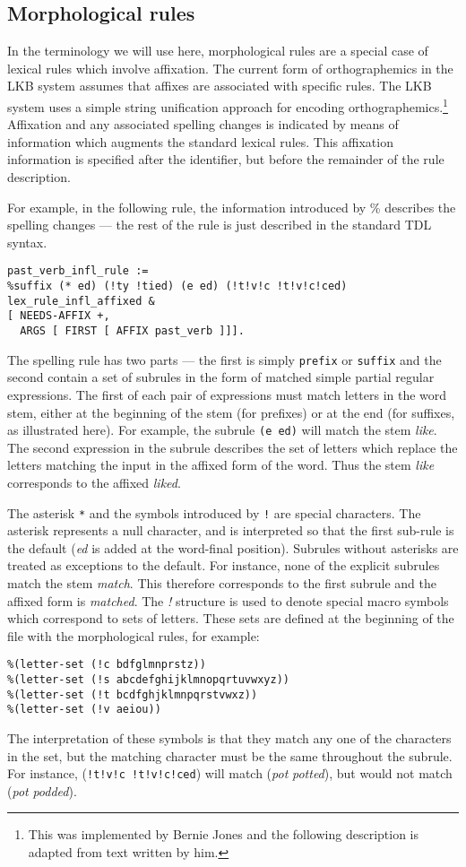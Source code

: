 \documentclass[12pt]{report}
\begin{document}
\subsection{Morphological rules}
\label{morphology}

In the terminology we will use here,
morphological rules are a special case of lexical rules which 
involve affixation.  
The current form of orthographemics in the LKB system
assumes that affixes are associated with specific rules.
The LKB system uses a simple string unification approach for encoding
orthographemics.\footnote{This was implemented by Bernie Jones
and the following description is adapted from text written by him.}
Affixation and any associated spelling changes
is indicated by means of information
which augments the standard lexical rules.
This affixation information
is specified after the identifier, but before the remainder 
of the rule description.

For example, in the following rule, the information introduced
by \% describes the spelling changes --- the rest of the rule
is just described in the standard TDL syntax.
\begin{verbatim}
past_verb_infl_rule :=
%suffix (* ed) (!ty !tied) (e ed) (!t!v!c !t!v!c!ced) 
lex_rule_infl_affixed &
[ NEEDS-AFFIX +,
  ARGS [ FIRST [ AFFIX past_verb ]]].
\end{verbatim}
The spelling rule has two parts --- the first is simply \verb+prefix+ or
\verb+suffix+ and the second
contain a set of subrules in the form of matched simple
partial regular expressions. The first of each pair of expressions must match
letters in the word stem, either at the beginning of the stem (for prefixes) or
at the end (for suffixes, as illustrated here).  For example, the
subrule \verb+(e ed)+ will match the stem {\it like}.
The second
expression in the subrule
describes the set of letters which replace
the letters matching the input in the affixed form of the word.
Thus the stem {\it like} corresponds to the affixed {\it liked}.

The asterisk \verb+*+ and the symbols introduced by \verb+!+
are special characters.
The asterisk represents a null character, and is interpreted
so that the first sub-rule is the default ({\it ed} is added at the word-final
position). 
Subrules without asterisks are treated as exceptions to the default.
For instance, none of the explicit subrules match the stem {\it match}.
This therefore corresponds to the first subrule and the affixed form
is {\it matched}.
The {\it !}  structure is used to denote special macro symbols
which correspond to sets of letters. These sets are
defined at the beginning
of the file with the morphological rules, for example:
\begin{verbatim}
%(letter-set (!c bdfglmnprstz))
%(letter-set (!s abcdefghijklmnopqrtuvwxyz))
%(letter-set (!t bcdfghjklmnpqrstvwxz))
%(letter-set (!v aeiou))
\end{verbatim}
The interpretation of these symbols is that they match any one of the
characters in the set, but the matching character must be the same 
throughout the subrule.  For instance, (\verb+!t!v!c !t!v!c!ced+) 
will match ({\it pot} {\it potted}), but would not match 
({\it pot} {\it podded}).
 
\end{document}
